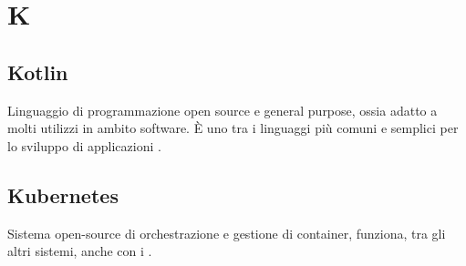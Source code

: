 \section*{K}
\markright{}
\subsection*{Kotlin}
Linguaggio di programmazione open source e general purpose, ossia adatto a molti utilizzi in ambito software. È uno tra i linguaggi più comuni e semplici per lo sviluppo di applicazioni .  
\subsection*{Kubernetes}
Sistema open-source di orchestrazione e gestione di container, funziona, tra gli altri sistemi, anche con i .